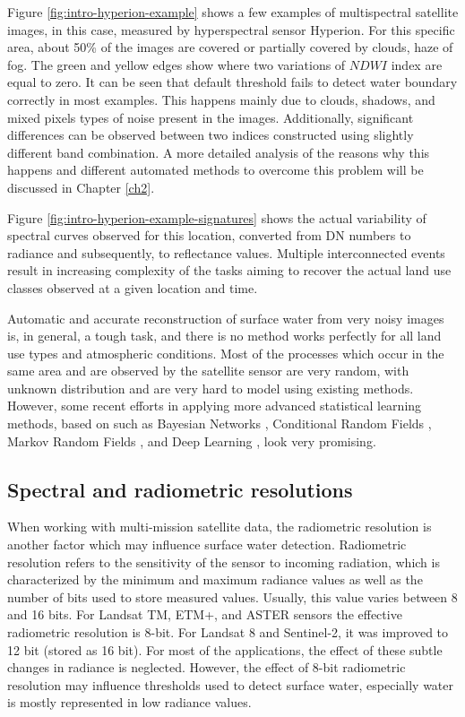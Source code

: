 Figure \ref{fig:intro-hyperion-example} shows a few examples of multispectral satellite images, in this case, measured by hyperspectral sensor Hyperion. For this specific area, about 50\% of the images are covered or partially covered by clouds, haze of fog. The green and yellow edges show where two variations of $NDWI$ index are equal to zero. It can be seen that default threshold fails to detect water boundary correctly in most examples. This happens mainly due to clouds, shadows, and mixed pixels types of noise present in the images. Additionally, significant differences can be observed between two indices constructed using slightly different band combination. A more detailed analysis of the reasons why this happens and different automated methods to overcome this problem will be discussed in Chapter \ref{ch2}.

Figure \ref{fig:intro-hyperion-example-signatures} shows the actual variability of spectral curves observed for this location, converted from DN numbers to radiance and subsequently, to reflectance values. Multiple interconnected events result in increasing complexity of the tasks aiming to recover the actual land use classes observed at a given location and time.

Automatic and accurate reconstruction of surface water from very noisy images is, in general, a tough task, and there is no method works perfectly for all land use types and atmospheric conditions. Most of the processes which occur in the same area and are observed by the satellite sensor are very random, with unknown distribution and are very hard to model using existing methods. However, some recent efforts in applying more advanced statistical learning methods, based on such as Bayesian Networks \citep{mello2013bayesian}, Conditional Random Fields \citep{hoberg2015conditional}, Markov Random Fields \citep{elmi2016dynamic}, and Deep Learning \citep{chen2014deep}, look very promising.

\subsection{Spectral and radiometric resolutions}

When working with multi-mission satellite data, the radiometric resolution is another factor which may influence surface water detection.  Radiometric resolution refers to the sensitivity of the sensor to incoming radiation, which is characterized by the minimum and maximum radiance values as well as the number of bits used to store measured values. Usually, this value varies between 8 and 16 bits. For Landsat TM, ETM+, and ASTER sensors the effective radiometric resolution is 8-bit. For Landsat 8 and Sentinel-2, it was improved to 12 bit (stored as 16 bit). For most of the applications, the effect of these subtle changes in radiance is neglected. However, the effect of 8-bit radiometric resolution may influence thresholds used to detect surface water, especially water is mostly represented in low radiance values.

